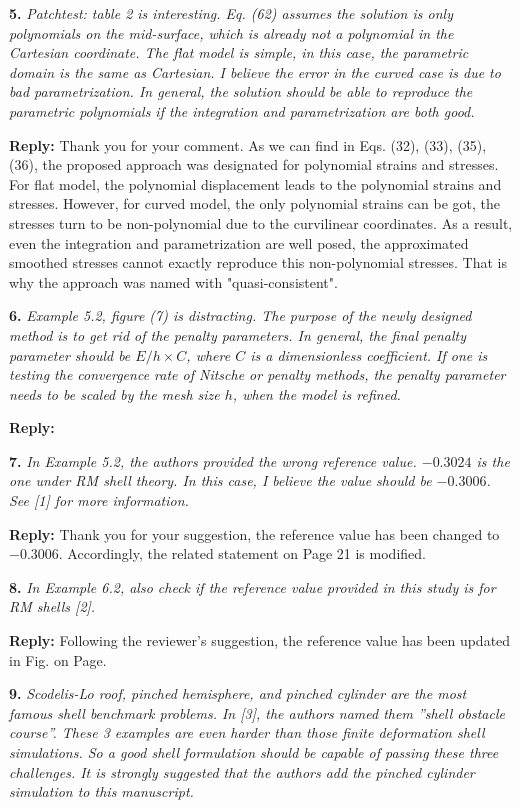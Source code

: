 \documentclass{article}
\begin{document}
\textbf{5.} \textit{Patchtest: table 2 is interesting. Eq. (62) assumes the solution is only polynomials on the mid-surface, which is already not a polynomial in the Cartesian coordinate. The flat model is simple, in this case, the parametric domain is the same as Cartesian. I believe the error in the curved case is due to bad parametrization. In general, the solution should be able to reproduce the parametric polynomials if the integration and parametrization are both good.}

\textbf{Reply:} Thank you for your comment. As we can find in Eqs. (32), (33), (35), (36),  the proposed approach was designated for polynomial strains and stresses. For flat model, the polynomial displacement leads to the polynomial strains and stresses. However, for curved model, the only polynomial strains can be got, the stresses turn to be non-polynomial due to the curvilinear coordinates. As a result, even the integration and parametrization are well posed, the approximated smoothed stresses cannot exactly reproduce this non-polynomial stresses. That is why the approach was named with "quasi-consistent".
 
\textbf{6.} \textit{Example 5.2, figure (7) is distracting. The purpose of the newly designed method is to get rid of the penalty parameters. In general, the final penalty parameter should be $E/h\times C$, where $C$ is a dimensionless coefficient. If one is testing the convergence rate of Nitsche or penalty methods, the penalty parameter needs to be scaled by the mesh size $h$, when the model is refined.}

\textbf{Reply:}

\textbf{7.} \textit{In Example 5.2, the authors provided the wrong reference value. $-0.3024$ is the one under RM shell theory. In this case, I believe the value should be $-0.3006$. See [1] for more information.}

\textbf{Reply:} Thank you for your suggestion, the reference value has been changed to $-0.3006$. Accordingly, the related statement on Page 21 is modified.

\textbf{8.} \textit{In Example 6.2, also check if the reference value provided in this study is for RM shells [2].}

\textbf{Reply:} Following the reviewer's suggestion, the reference value has been updated in Fig. on Page.

\textbf{9.} \textit{Scodelis-Lo roof, pinched hemisphere, and pinched cylinder are the most famous shell benchmark problems. In [3], the authors named them ”shell obstacle course”. These 3 examples are even harder than those finite deformation shell simulations. So a good shell formulation should be capable of passing these three challenges. It is strongly suggested that the authors add the pinched cylinder simulation to this manuscript.}
\end{document}
